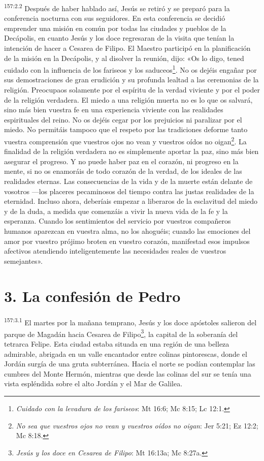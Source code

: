 \par 
\textsuperscript{157:2.2} Después de haber hablado así, Jesús se retiró y se preparó para la conferencia nocturna con sus seguidores. En esta conferencia se decidió emprender una misión en común por todas las ciudades y pueblos de la Decápolis, en cuanto Jesús y los doce regresaran de la visita que tenían la intención de hacer a Cesarea de Filipo. El Maestro participó en la planificación de la misión en la Decápolis, y al disolver la reunión, dijo: «Os lo digo, tened cuidado con la influencia de los fariseos y los saduceos\footnote{\textit{Cuidado con la levadura de los fariseos}: Mt 16:6; Mc 8:15; Lc 12:1.}. No os dejéis engañar por sus demostraciones de gran erudición y su profunda lealtad a las ceremonias de la religión. Preocupaos solamente por el espíritu de la verdad viviente y por el poder de la religión verdadera. El miedo a una religión muerta no es lo que os salvará, sino más bien vuestra fe en una experiencia viviente con las realidades espirituales del reino. No os dejéis cegar por los prejuicios ni paralizar por el miedo. No permitáis tampoco que el respeto por las tradiciones deforme tanto vuestra comprensión que vuestros ojos no vean y vuestros oídos no oigan\footnote{\textit{No sea que vuestros ojos no vean y vuestros oídos no oigan}: Jer 5:21; Ez 12:2; Mc 8:18.}. La finalidad de la religión verdadera no es simplemente aportar la paz, sino más bien asegurar el progreso. Y no puede haber paz en el corazón, ni progreso en la mente, si no os enamoráis de todo corazón de la verdad, de los ideales de las realidades eternas. Las consecuencias de la vida y de la muerte están delante de vosotros ---los placeres pecaminosos del tiempo contra las justas realidades de la eternidad. Incluso ahora, deberíais empezar a liberaros de la esclavitud del miedo y de la duda, a medida que comenzáis a vivir la nueva vida de la fe y la esperanza. Cuando los sentimientos del servicio por vuestros compañeros humanos aparezcan en vuestra alma, no los ahoguéis; cuando las emociones del amor por vuestro prójimo broten en vuestro corazón, manifestad esos impulsos afectivos atendiendo inteligentemente las necesidades reales de vuestros semejantes».

\section*{3. La confesión de Pedro}
\par 
\textsuperscript{157:3.1} El martes por la mañana temprano, Jesús y los doce apóstoles salieron del parque de Magadán hacia Cesarea de Filipo\footnote{\textit{Jesús y los doce en Cesarea de Filipo}: Mt 16:13a; Mc 8:27a.}, la capital de la soberanía del tetrarca Felipe. Esta ciudad estaba situada en una región de una belleza admirable, abrigada en un valle encantador entre colinas pintorescas, donde el Jordán surgía de una gruta subterránea. Hacia el norte se podían contemplar las cumbres del Monte Hermón, mientras que desde las colinas del sur se tenía una vista espléndida sobre el alto Jordán y el Mar de Galilea.

